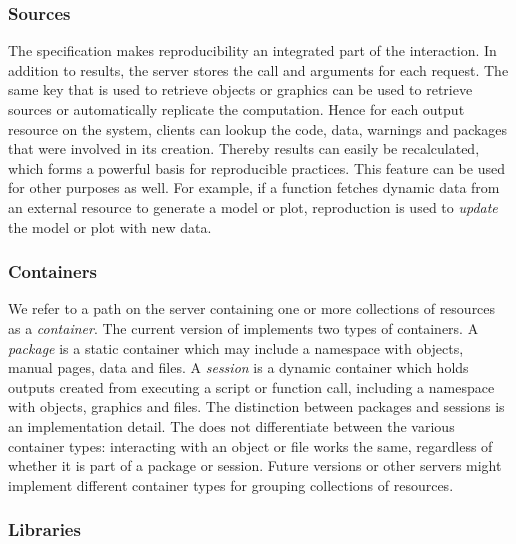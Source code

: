 \subsubsection{Sources}

The \OpenCPU specification makes reproducibility an integrated part of the \API interaction. In addition to results, the server stores the call and arguments for each \RPC request. The same key that is used to retrieve objects or graphics can be used to retrieve sources or automatically replicate the computation. Hence for each output resource on the system, clients can lookup the code, data, warnings and packages that were involved in its creation. Thereby results can easily be recalculated, which forms a powerful basis for reproducible practices. This feature can be used for other purposes as well. For example, if a function fetches dynamic data from an external resource to generate a model or plot, reproduction is used to \emph{update} the model or plot with new data.

\subsubsection{Containers}

We refer to a path on the server containing one or more collections of resources as a \emph{container}. The current version of \OpenCPU implements two types of containers. A \emph{package} is a static container which may include a namespace with \R objects, manual pages, data and files.  A \emph{session} is a dynamic container which holds outputs created from executing a script or function call, including a namespace with \R objects, graphics and files. The distinction between packages and sessions is an implementation detail. The \API does not differentiate between the various container types: interacting with an object or file works the same, regardless of whether it is part of a package or session. Future versions or other servers might implement different container types for grouping collections of resources.

\subsubsection{Libraries}

